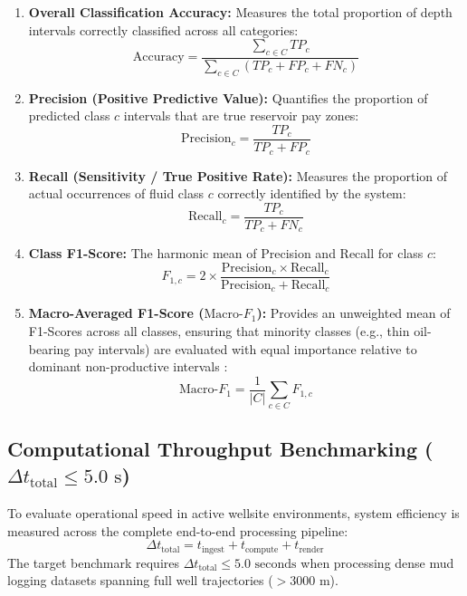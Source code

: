 \begin{enumerate}
    \item \textbf{Overall Classification Accuracy:} Measures the total proportion of depth intervals correctly classified across all categories:
    \begin{equation}
        \text{Accuracy} = \frac{\sum_{c \in C} TP_c}{\sum_{c \in C} (TP_c + FP_c + FN_c)}
    \end{equation}

    \item \textbf{Precision (Positive Predictive Value):} Quantifies the proportion of predicted class $c$ intervals that are true reservoir pay zones:
    \begin{equation}
        \text{Precision}_c = \frac{TP_c}{TP_c + FP_c}
    \end{equation}

    \item \textbf{Recall (Sensitivity / True Positive Rate):} Measures the proportion of actual occurrences of fluid class $c$ correctly identified by the system:
    \begin{equation}
        \text{Recall}_c = \frac{TP_c}{TP_c + FN_c}
    \end{equation}

    \item \textbf{Class F1-Score:} The harmonic mean of Precision and Recall for class $c$:
    \begin{equation}
        F_{1, c} = 2 \times \frac{\text{Precision}_c \times \text{Recall}_c}{\text{Precision}_c + \text{Recall}_c}
    \end{equation}

    \item \textbf{Macro-Averaged F1-Score ($\text{Macro-}F_1$):} Provides an unweighted mean of F1-Scores across all classes, ensuring that minority classes (e.g., thin oil-bearing pay intervals) are evaluated with equal importance relative to dominant non-productive intervals \citep{sokolova2009}:
    \begin{equation}
        \text{Macro-}F_1 = \frac{1}{|C|} \sum_{c \in C} F_{1, c}
    \end{equation}
\end{enumerate}

\subsection{Computational Throughput Benchmarking ($\Delta t_{\text{total}} \le 5.0\text{ s}$)}
To evaluate operational speed in active wellsite environments, system efficiency is measured across the complete end-to-end processing pipeline:
\begin{equation}
    \Delta t_{\text{total}} = t_{\text{ingest}} + t_{\text{compute}} + t_{\text{render}}
\end{equation}
The target benchmark requires $\Delta t_{\text{total}} \le 5.0\text{ seconds}$ when processing dense mud logging datasets spanning full well trajectories ($> 3000\text{ m}$).

